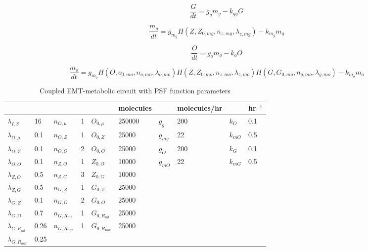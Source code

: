 \documentclass{article}
\begin{document}
\begin{equation}
\frac{G}{dt} = g_g m_g - k_{gg} G
\end{equation}

\begin{equation}
\frac{m_g}{dt} = g_{m_g} H(Z,Z_{0,mg},n_{z,mg},\lambda_{z,mg}) - k_{m_g} m_g
\end{equation}

\begin{equation}
\frac{O}{dt} = g_o m_o - k_{o} O
\end{equation}

\begin{equation}
\frac{m_o}{dt} = g_{m_o}H(O,o_{0,mo},n_{o,mo},\lambda_{o,mo}) H(Z,Z_{0,mo},n_{z,mo},\lambda_{z,mo}) H(G,G_{0,mo},n_{g,mo},\lambda_{g,mo}) - k_{m_o} m_o
\end{equation}



\begin{table}[]
\begin{tabular}{ll|ll|ll|ll|ll|}
                &     &                     &    &               &  molecules & & molecules/hr  & & hr$^{-1}$\\
                \hline
$\lambda_{I,S} $ & 16&        $n_{O,\mu} $& 1&      $O_{0,\mu}$ & 250000&  $g_g$ & 200&   $k_O $& 0.1\\
$\lambda_{O,\mu}$ & 0.1&      $n_{O,Z} $& 1&        $O_{0,Z}$ & 25000&     $g_{mg}$ & 22& $k_{mO}$ & 0.5\\
$\lambda_{O,Z} $& 0.1&        $n_{O,O} $& 2&        $O_{0,O}$ & 25000&     $g_{O} $& 200& $k_G$ & 0.1\\
$\lambda_{O,O}$ & 0.1&        $n_{Z,O}$ & 1&        $Z_{0,O} $& 10000&     $g_{mO}$ & 22& $k_{mG}$ & 0.5\\
$\lambda_{Z,O}$ & 0.5&        $n_{Z,G} $& 3&        $Z_{0,G}$ & 10000&              &  & & \\
$\lambda_{Z,G}$ & 0.5&        $n_{G,Z}$ & 1 &       $G_{0,Z}$ & 25000&  &  & & \\
$\lambda_{G,Z}$ & 0.1&        $n_{G,O}$ & 2&        $G_{0,O}$ & 25000&  &  & & \\
$\lambda_{G,O}$ & 0.7&        $n_{G,R_{mt}}$ & 1&   $G_{0,R_{mt}}$ & 25000&  &  & & \\
$\lambda_{G,R_{mt}}$ & 0.26&  $n_{G,R_{nox}}$ & 1&  $G_{0,R_{nox}}$ & 25000&  &  & & \\
$\lambda_{G,R_{nox}} $& 0.25& & & & & & & & \\

\end{tabular}
\caption{Coupled EMT-metabolic circuit with PSF function parameters}
\label{table:PSFparams}
\end{table}
\end{document}

